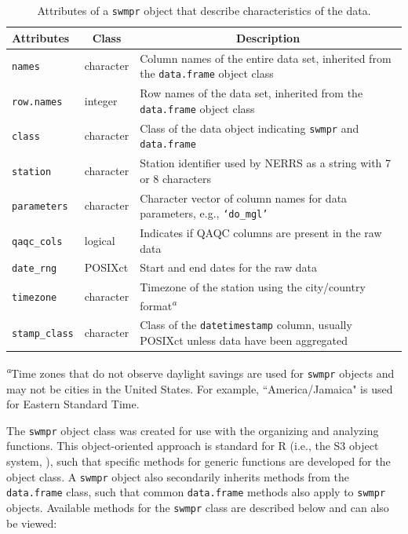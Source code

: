\documentclass[10pt,letterpaper]{article}\usepackage[]{graphicx}\usepackage[]{color}
\begin{document}
\begin{table}[!tbp]
\caption{Attributes of a \texttt{swmpr} object that describe characteristics of the data.\label{tab:attributes}} 
\begin{center}
\begin{tabular}{lp{0.75in}p{3.25in}}
\hline\hline
\multicolumn{1}{l}{Attributes}&\multicolumn{1}{c}{Class}&\multicolumn{1}{c}{Description}\tabularnewline
\hline
\texttt{names}&character&Column names of the entire data set, inherited from the \texttt{data.frame} object class\tabularnewline
\texttt{row.names}&integer&Row names of the data set, inherited from the \texttt{data.frame} object class\tabularnewline
\texttt{class}&character&Class of the data object indicating \texttt{swmpr} and \texttt{data.frame}\tabularnewline
\texttt{station}&character&Station identifier used by \ac{NERRS} as a string with 7 or 8 characters\tabularnewline
\texttt{parameters}&character&Character vector of column names for data parameters, e.g., \texttt{`do\_mgl'}\tabularnewline
\texttt{qaqc\_cols}&logical&Indicates if \ac{QAQC} columns are present in the raw data\tabularnewline
\texttt{date\_rng}&POSIXct&Start and end dates for the raw data\tabularnewline
\texttt{timezone}&character&Timezone of the station using the city/country format\textsuperscript{\textit{a}}\tabularnewline
\texttt{stamp\_class}&character&Class of the \texttt{datetimestamp} column, usually POSIXct unless data have been aggregated\tabularnewline
\hline
\end{tabular}\end{center}

\textsuperscript{\textit{a}}\footnotesize Time zones that do not observe daylight savings are used for \texttt{swmpr} objects and may not be cities in the United States.  For example, ``America/Jamaica" is used for Eastern Standard Time.\end{table}


The \texttt{swmpr} object class was created for use with the organizing and analyzing functions.  This object-oriented approach is standard for R (i.e., the S3 object  system, \cite{Wickham14}), such that specific methods for generic functions are developed for the object class.  A \texttt{swmpr} object also secondarily inherits methods from the \texttt{data.frame} class, such that common \texttt{data.frame} methods also apply to \texttt{swmpr} objects.  Available methods for the \texttt{swmpr} class are described below and can also be viewed:
 
\end{document}
